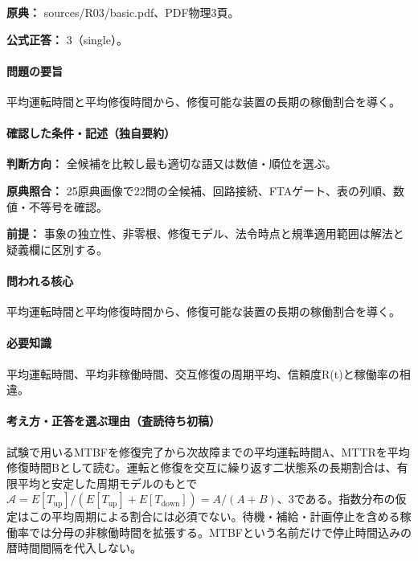 \noindent\textbf{原典：} sources/R03/basic.pdf、PDF物理3頁。

\textbf{公式正答：} 3（single）。

\paragraph{問題の要旨} 平均運転時間と平均修復時間から、修復可能な装置の長期の稼働割合を導く。

\paragraph{確認した条件・記述（独自要約）}\mbox{}\par

\noindent\textbf{判断方向：} 全候補を比較し最も適切な語又は数値・順位を選ぶ。\par

\noindent\textbf{原典照合：} 25原典画像で22問の全候補、回路接続、FTAゲート、表の列順、数値・不等号を確認。\par

\noindent\textbf{前提：} 事象の独立性、非零根、修復モデル、法令時点と規準適用範囲は解法と疑義欄に区別する。\par

\paragraph{問われる核心} 平均運転時間と平均修復時間から、修復可能な装置の長期の稼働割合を導く。

\paragraph{必要知識} 平均運転時間、平均非稼働時間、交互修復の周期平均、信頼度R(t)と稼働率の相違。

\paragraph{考え方・正答を選ぶ理由（査読待ち初稿）} 試験で用いるMTBFを修復完了から次故障までの平均運転時間A、MTTRを平均修復時間Bとして読む。運転と修復を交互に繰り返す二状態系の長期割合は、有限平均と安定した周期モデルのもとで \(\mathcal A=E[T_{\mathrm{up}}]/(E[T_{\mathrm{up}}]+E[T_{\mathrm{down}}])=A/(A+B)\)、3である。指数分布の仮定はこの平均周期による割合には必須でない。待機・補給・計画停止を含める稼働率では分母の非稼働時間を拡張する。MTBFという名前だけで停止時間込みの暦時間間隔を代入しない。

